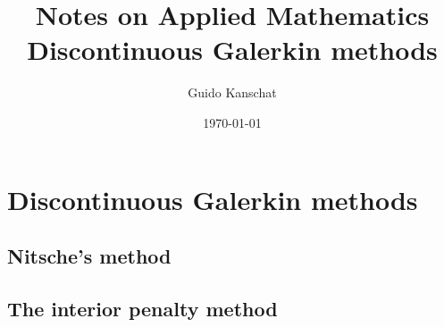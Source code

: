 \documentclass[USenglish,12pt]{report}
\title{\textbf{Notes on Applied Mathematics}
\\[5mm]
{\large Discontinuous Galerkin methods}}
\author{Guido Kanschat}
\date{\today}
\begin{document}
\maketitle

\chapter{Discontinuous Galerkin methods}
\section{Nitsche's method}
\label{sec:nitsches-method}


\section{The interior penalty method}
\label{sec:interior-penalty}

\end{document}
